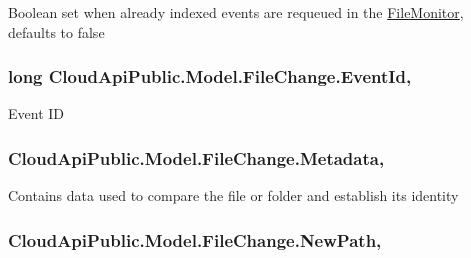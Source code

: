 Boolean set when already indexed events are requeued in the \hyperlink{namespace_cloud_api_public_1_1_file_monitor}{File\-Monitor}, defaults to false 

\hypertarget{class_cloud_api_public_1_1_model_1_1_file_change_aef22ff9ac6993f82e3612d05f093e836}{
\subsubsection[{Event\-Id}]{\setlength{\rightskip}{0pt plus 5cm}long Cloud\-Api\-Public.\-Model.\-File\-Change.\-Event\-Id\hspace{0.3cm}{\ttfamily [get]}, {\ttfamily [set]}}}\label{class_cloud_api_public_1_1_model_1_1_file_change_aef22ff9ac6993f82e3612d05f093e836}


Event I\-D 

\hypertarget{class_cloud_api_public_1_1_model_1_1_file_change_ae4e797c6b4b11f9686e4cb1318dab9a5}{
\subsubsection[{Metadata}]{ Cloud\-Api\-Public.\-Model.\-File\-Change.\-Metadata\hspace{0.3cm}{\ttfamily [get]}, {\ttfamily [set]}}}\label{class_cloud_api_public_1_1_model_1_1_file_change_ae4e797c6b4b11f9686e4cb1318dab9a5}


Contains data used to compare the file or folder and establish its identity 

\hypertarget{class_cloud_api_public_1_1_model_1_1_file_change_ad7383c43cc51606f17c63fad6c032c7c}{
\subsubsection[{New\-Path}]{ Cloud\-Api\-Public.\-Model.\-File\-Change.\-New\-Path\hspace{0.3cm}{\ttfamily [get]}, {\ttfamily [set]}}}\label{class_cloud_api_public_1_1_model_1_1_file_change_ad7383c43cc51606f17c63fad6c032c7c}


